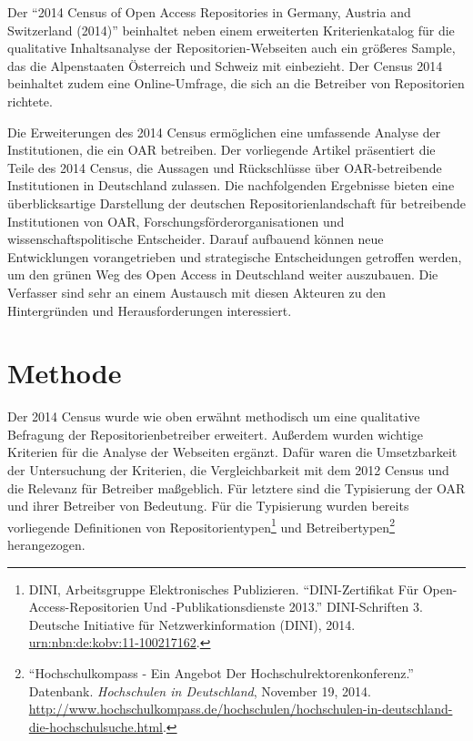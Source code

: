 \documentclass[a4paper,
fontsize=11pt,
oneside,
numbers=noperiodatend,
parskip=half-,
bibliography=totoc,
final
]{scrartcl}
\begin{document}
Der \enquote{2014 Census of Open Access Repositories in Germany, Austria
and Switzerland (2014)} beinhaltet neben einem erweiterten
Kriterienkatalog für die qualitative Inhaltsanalyse der
Repo\-sitorien-Webseiten auch ein größeres Sample, das die Alpenstaaten
Österreich und Schweiz mit einbezieht. Der Census 2014 beinhaltet zudem
eine Online-Umfrage, die sich an die Betreiber von Repositorien
richtete.

Die Erweiterungen des 2014 Census ermöglichen eine umfassende Analyse
der Institutionen, die ein OAR betreiben. Der vorliegende Artikel
präsentiert die Teile des 2014 Census, die Aussagen und Rückschlüsse
über OAR-betreibende Institutionen in Deutschland zulassen. Die
nachfolgenden Ergebnisse bieten eine überblicksartige Darstellung der
deutschen Repositorienlandschaft für betreibende Institutionen von OAR,
Forschungsförderorganisationen und wissenschaftspolitische Entscheider.
Darauf aufbauend können neue Entwicklungen vorangetrieben und
strategische Entscheidungen getroffen werden, um den grünen Weg des Open
Access in Deutschland weiter auszubauen. Die Verfasser sind sehr an
einem Austausch mit diesen Akteuren zu den Hintergründen und
Herausforderungen interessiert.

\section*{Methode}\label{methode}

Der 2014 Census wurde wie oben erwähnt methodisch um eine qualitative
Befragung der Repositorienbetreiber erweitert. Außerdem wurden wichtige
Kriterien für die Analyse der Webseiten ergänzt. Dafür waren die
Umsetzbarkeit der Untersuchung der Kriterien, die Vergleichbarkeit mit
dem 2012 Census und die Relevanz für Betreiber maßgeblich. Für letztere
sind die Typisierung der OAR und ihrer Betreiber von Bedeutung. Für die
Typisierung wurden bereits vorliegende Definitionen von
Repositorientypen\footnote{DINI, Arbeitsgruppe Elektronisches
  Publizieren. \enquote{DINI-Zertifikat Für Open-Access-Repositorien Und
  -Publikationsdienste 2013.} DINI-Schriften 3. Deutsche Initiative für
  Netzwerkinformation (DINI), 2014.
  \href{http://nbn-resolving.de/urn:nbn:de:kobv:11-100217162}{urn:nbn:de:kobv:11-100217162}.}
und Betreibertypen\footnote{\enquote{Hochschulkompass - Ein Angebot Der
  Hochschulrektorenkonferenz.} Datenbank. \emph{Hochschulen in
  Deutschland}, November 19, 2014.
  \url{http://www.hochschulkompass.de/hochschulen/hochschulen-in-deutschland-die-hochschulsuche.html}.}
herangezogen.
\end{document}
